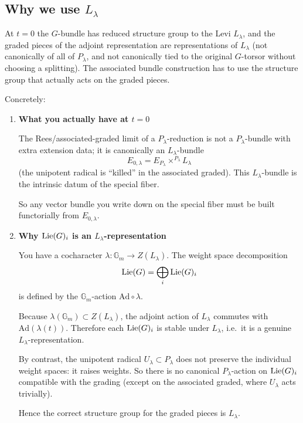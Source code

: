 \documentclass[12pt]{article}
\begin{document}
\subsection{Why we use $L_\lambda$}

At $t=0$ the $G$-bundle has reduced structure group to the Levi $L_\lambda$, and the graded pieces of the adjoint representation are representations of $L_\lambda$ (not canonically of all of $P_\lambda$, and not canonically tied to the original $G$-torsor without choosing a splitting). The associated bundle construction has to use the structure group that actually acts on the graded pieces.

Concretely:

\begin{enumerate}
    \item \textbf{What you actually have at $t=0$}
    
    The Rees/associated-graded limit of a $P_\lambda$-reduction is not a $P_\lambda$-bundle with extra extension data; it is canonically an $L_\lambda$-bundle
    \[
    E_{0,\lambda}=E_{P_\lambda}\times^{P_\lambda} L_\lambda
    \]
    (the unipotent radical is ``killed'' in the associated graded). This $L_\lambda$-bundle is the intrinsic datum of the special fiber.
    
    So any vector bundle you write down on the special fiber must be built functorially from $E_{0,\lambda}$.
    
    \item \textbf{Why $\operatorname{Lie}(G)_i$ is an $L_\lambda$-representation}
    
    You have a cocharacter $\lambda:\mathbb{G}_m\to Z(L_\lambda)$. The weight space decomposition
    \[
    \operatorname{Lie}(G)=\bigoplus_i \operatorname{Lie}(G)_i
    \]
    is defined by the $\mathbb{G}_m$-action $\mathrm{Ad}\circ \lambda$.
    
    Because $\lambda(\mathbb{G}_m)\subset Z(L_\lambda)$, the adjoint action of $L_\lambda$ commutes with $\mathrm{Ad}(\lambda(t))$. Therefore each $\operatorname{Lie}(G)_i$ is stable under $L_\lambda$, i.e.\ it is a genuine $L_\lambda$-representation.
    
    By contrast, the unipotent radical $U_\lambda\subset P_\lambda$ does not preserve the individual weight spaces: it raises weights. So there is no canonical $P_\lambda$-action on $\operatorname{Lie}(G)_i$ compatible with the grading (except on the associated graded, where $U_\lambda$ acts trivially).
    
    Hence the correct structure group for the graded pieces is $L_\lambda$.
    

\end{enumerate}
\end{document}
